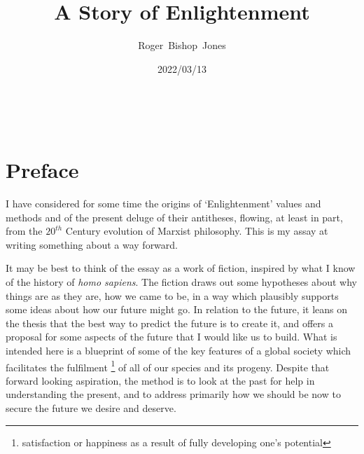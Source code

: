 \documentclass[10pt,titlepage]{article}
\title{\LARGE\bf A Story of Enlightenment}
\author{Roger~Bishop~Jones}
\date{\small 2022/03/13}
\newcommand{\ignore}[1]{}
\begin{document}
                               
\begin{titlepage}
\maketitle





\end{titlepage}

\ \

\ignore{
\begin{centering}
{}
\end{centering}
}%

\setcounter{tocdepth}{2}
{\parskip-0pt\tableofcontents}


\pagebreak

\section*{Preface}

I have considered for some time the origins of `Enlightenment' values and methods and of the present deluge of their antitheses, flowing, at least in part, from the $20^{th}$ Century evolution of Marxist philosophy.
This is my assay at writing something about a way forward.

It may be best to think of the essay as a work of fiction, inspired by what I know of the history of \emph{homo sapiens}.
The fiction draws out some hypotheses about why things are as they are, how we came to be, in a way which plausibly supports some ideas about how our future might go.
In relation to the future, it leans on the thesis that the best way to predict the future is to create it, and offers a proposal for some aspects of the future that I would like us to build.
What is intended here is a blueprint of some of the key features of a global society which facilitates the fulfilment%
\footnote{satisfaction or happiness as a result of fully developing one's potential}
of all of our species and its progeny.
Despite that forward looking aspiration, the method is to look at the past for help in understanding the present, and to address primarily how we should be now to secure the future we desire and deserve.
\end{document}
